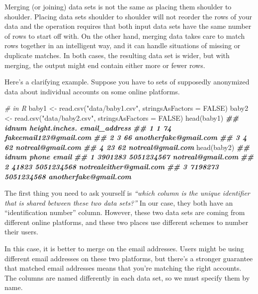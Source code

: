 \documentclass[
  12pt,
  krantz2]{krantz}
\makeatletter
\newenvironment{Shaded}{\begin{snugshade}}{\end{snugshade}}
\newcommand{\AttributeTok}[1]{\textcolor[rgb]{0.61,0.61,0.61}{#1}}
\newcommand{\CommentTok}[1]{\textcolor[rgb]{0.37,0.37,0.37}{\textit{#1}}}
\newcommand{\ConstantTok}[1]{\textcolor[rgb]{0,0,0}{#1}}
\newcommand{\DocumentationTok}[1]{\textcolor[rgb]{0.37,0.37,0.37}{\textbf{\textit{#1}}}}
\newcommand{\FunctionTok}[1]{\textcolor[rgb]{0,0,0}{#1}}
\newcommand{\NormalTok}[1]{#1}
\newcommand{\OtherTok}[1]{\textcolor[rgb]{0.37,0.37,0.37}{#1}}
\newcommand{\StringTok}[1]{\textcolor[rgb]{0.5,0.5,0.5}{#1}}
\newenvironment{kframe}{%
\medskip{}
\setlength{\fboxsep}{.8em}
 \def\at@end@of@kframe{}%
 \ifinner\ifhmode%
  \def\at@end@of@kframe{\end{minipage}}%
  \begin{minipage}{\columnwidth}%
 \fi\fi%
 \def\FrameCommand##1{\hskip\@totalleftmargin \hskip-\fboxsep
 \colorbox{shadecolor}{##1}\hskip-\fboxsep
     \hskip-\linewidth \hskip-\@totalleftmargin \hskip\columnwidth}%
 \MakeFramed {\advance\hsize-\width
   \@totalleftmargin\z@ \linewidth\hsize
   \@setminipage}}%
 {\par\unskip\endMakeFramed%
 \at@end@of@kframe}
\renewenvironment{Shaded}{\begin{kframe}}{\end{kframe}}
\makeatother
\begin{document}
Merging (or joining) data sets is not the same as placing them shoulder to shoulder. Placing data sets shoulder to shoulder will not reorder the rows of your data and the operation requires that both input data sets have the same number of rows to start off with. On the other hand, merging data takes care to match rows together in an intelligent way, and it can handle situations of missing or duplicate matches. In both cases, the resulting data set is wider, but with merging, the output might end contain either more or fewer rows.

Here's a clarifying example. Suppose you have to sets of supposedly anonymized data about individual accounts on some online platforms.

\begin{Shaded}
\begin{Highlighting}[]
\CommentTok{\# in R}
\NormalTok{baby1 }\OtherTok{\textless{}{-}} \FunctionTok{read.csv}\NormalTok{(}\StringTok{"data/baby1.csv"}\NormalTok{, }\AttributeTok{stringsAsFactors =} \ConstantTok{FALSE}\NormalTok{)}
\NormalTok{baby2 }\OtherTok{\textless{}{-}} \FunctionTok{read.csv}\NormalTok{(}\StringTok{"data/baby2.csv"}\NormalTok{, }\AttributeTok{stringsAsFactors =} \ConstantTok{FALSE}\NormalTok{)}
\FunctionTok{head}\NormalTok{(baby1)}
\DocumentationTok{\#\#   idnum height.inches.          email\_address}
\DocumentationTok{\#\# 1     1             74 fakeemail123@gmail.com}
\DocumentationTok{\#\# 2     3             66  anotherfake@gmail.com}
\DocumentationTok{\#\# 3     4             62      notreal@gmail.com}
\DocumentationTok{\#\# 4    23             62      notreal@gmail.com}
\FunctionTok{head}\NormalTok{(baby2)}
\DocumentationTok{\#\#     idnum      phone                   email}
\DocumentationTok{\#\# 1 3901283 5051234567       notreal@gmail.com}
\DocumentationTok{\#\# 2   41823 5051234568 notrealeither@gmail.com}
\DocumentationTok{\#\# 3 7198273 5051234568   anotherfake@gmail.com}
\end{Highlighting}
\end{Shaded}

The first thing you need to ask yourself is \emph{``which column is the unique identifier that is shared between these two data sets?''} In our case, they both have an ``identification number'' column. However, these two data sets are coming from different online platforms, and these two places use different schemes to number their users.

In this case, it is better to merge on the email addresses. Users might be using different email addresses on these two platforms, but there's a stronger guarantee that matched email addresses means that you're matching the right accounts. The columns are named differently in each data set, so we must specify them by name.
\end{document}
